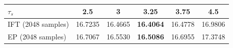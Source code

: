 \begin{tabular}{lccccc}
\toprule
$\tau_s$ & 2.5 & 3 & 3.25 & 3.75 & 4.5 \\
\midrule
IFT (2048 samples) & 16.7235 & 16.4665 & \textbf{16.4064} & 16.4778 & 16.9806 \\
EP (2048 samples) & 16.7067 & 16.5530 & \textbf{16.5086} & 16.6955 & 17.3748 \\
\bottomrule
\end{tabular}

